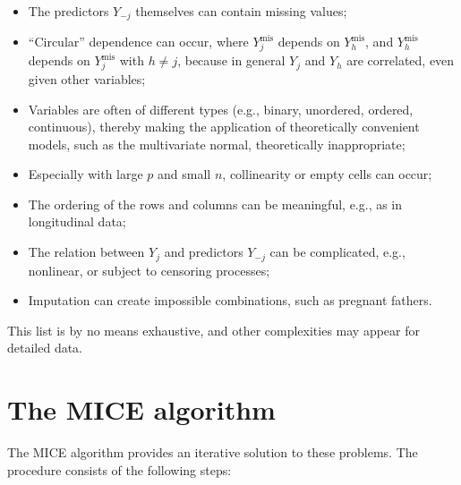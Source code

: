 \documentclass[
]{book}
\providecommand{\tightlist}{%
  \setlength{\itemsep}{0pt}\setlength{\parskip}{0pt}}
\begin{document}
\begin{itemize}
\tightlist
\item
  The predictors \(Y_{-j}\) themselves can contain missing values;
\item
  ``Circular'' dependence can occur, where \(Y_j^\mathrm{mis}\) depends on \(Y_h^\mathrm{mis}\), and \(Y_h^\mathrm{mis}\) depends on \(Y_j^\mathrm{mis}\) with \(h \neq j\), because in general \(Y_j\) and \(Y_h\) are correlated, even given other variables;
\item
  Variables are often of different types (e.g., binary, unordered, ordered, continuous), thereby making the application of theoretically convenient models, such as the multivariate normal, theoretically inappropriate;
\item
  Especially with large \(p\) and small \(n\), collinearity or empty cells can occur;
\item
  The ordering of the rows and columns can be meaningful, e.g., as in longitudinal data;
\item
  The relation between \(Y_j\) and predictors \(Y_{-j}\) can be complicated, e.g., nonlinear, or subject to censoring processes;
\item
  Imputation can create impossible combinations, such as pregnant fathers.
\end{itemize}

This list is by no means exhaustive, and other complexities may appear
for detailed data.

\section{The MICE algorithm}\label{sec:MICE}

The MICE algorithm provides an iterative solution to these problems. The procedure consists of the following steps:
\end{document}
